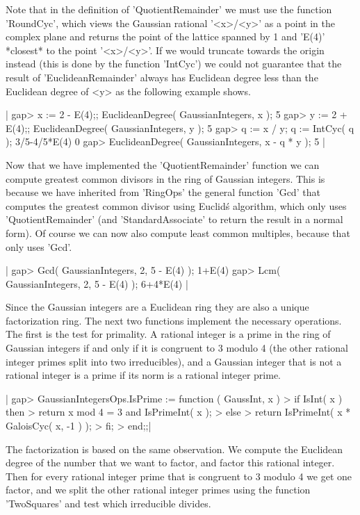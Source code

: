 Note  that  in  the definition  of  'QuotientRemainder'  we must use  the
function  'RoundCyc',  which views  the Gaussian rational '<x>/<y>'  as a
point  in the complex plane and returns the point of the  lattice spanned
by 1 and 'E(4)'  *closest* to the  point '<x>/<y>'.  If we would truncate
towards the  origin instead  (this is done  by the function 'IntCyc')  we
could  not guarantee  that the  result of 'EuclideanRemainder' always has
Euclidean degree less  than the Euclidean degree  of <y> as the following
example shows.

|    gap> x := 2 - E(4);;  EuclideanDegree( GaussianIntegers, x );
    5
    gap> y := 2 + E(4);;  EuclideanDegree( GaussianIntegers, y );
    5
    gap> q := x / y;  q := IntCyc( q );
    3/5-4/5*E(4)
    0
    gap> EuclideanDegree( GaussianIntegers, x - q * y );
    5 |

Now that  we  have implemented  the  'QuotientRemainder' function we  can
compute  greatest common divisors in the ring of Gaussian integers.  This
is because  we have  inherited  from 'RingOps' the general function 'Gcd'
that  computes the  greatest  common  divisor using  Euclid\'s algorithm,
which  only  uses 'QuotientRemainder'  (and 'StandardAssociate' to return
the  result in a normal form).  Of course we  can now also compute  least
common multiples, because that only uses 'Gcd'.

|    gap> Gcd( GaussianIntegers, 2, 5 - E(4) );
    1+E(4)
    gap> Lcm( GaussianIntegers, 2, 5 - E(4) );
    6+4*E(4) |

Since the  Gaussian integers are a Euclidean ring they  are also a unique
factorization ring.   The  next  two  functions implement  the  necessary
operations.  The first is the test for  primality.  A rational integer is
a prime in the ring of Gaussian  integers if and  only if it is congruent
to 3  modulo  4  (the  other  rational  integer  primes  split  into  two
irreducibles), and a Gaussian integer that is not a rational integer is a
prime if its norm is a rational integer prime.

|    gap> GaussianIntegersOps.IsPrime := function ( GaussInt, x )
    >     if IsInt( x )  then
    >         return x mod 4 = 3  and IsPrimeInt( x );
    >     else
    >         return IsPrimeInt( x * GaloisCyc( x, -1 ) );
    >     fi;
    > end;;|

The  factorization  is  based on the same  observation.  We  compute  the
Euclidean degree of  the number that we  want  to factor, and factor this
rational  integer.   Then  for  every  rational  integer  prime  that  is
congruent to  3  modulo  4 we  get one factor,  and  we  split the  other
rational  integer primes using  the function 'TwoSquares' and  test which
irreducible divides.


